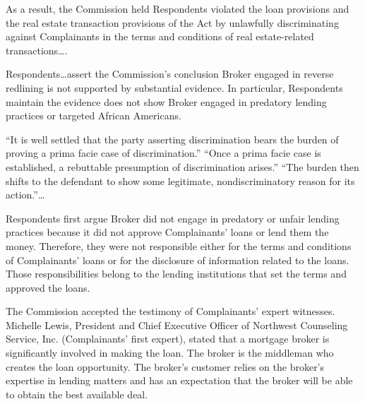 As a result, the Commission held Respondents violated the loan provisions and
the real estate transaction provisions of the Act by unlawfully discriminating
against Complainants in the terms and conditions of real estate-related
transactions\dots.


Respondents\dots assert the Commission's conclusion Broker engaged in reverse
redlining is not supported by substantial
evidence. In particular,
Respondents maintain the evidence does not show Broker engaged in predatory
lending practices or targeted African Americans.

 ``It is well settled that the party asserting discrimination bears the burden
of proving a prima facie case of discrimination.'' ``Once a prima facie case is
established, a rebuttable presumption of discrimination arises.'' ``The burden
then shifts to the defendant to show some legitimate, nondiscriminatory reason
for its action.''\ldots


Respondents first argue Broker did not engage in predatory or unfair lending
practices because it did not approve Complainants' loans or lend them the
money. Therefore, they were not responsible either for the terms and conditions
of Complainants' loans or for the disclosure of information related to the
loans. Those responsibilities belong to the lending institutions that set the
terms and approved the loans.

The Commission accepted the testimony of Complainants' expert witnesses.
Michelle Lewis, President and Chief Executive Officer of Northwest Counseling
Service, Inc. (Complainants' first expert), stated that a mortgage broker is
significantly involved in making the loan. The broker is the middleman who
creates the loan opportunity. The broker's customer relies on the broker's
expertise in lending matters and has an expectation that the broker will be
able to obtain the best available deal. 

